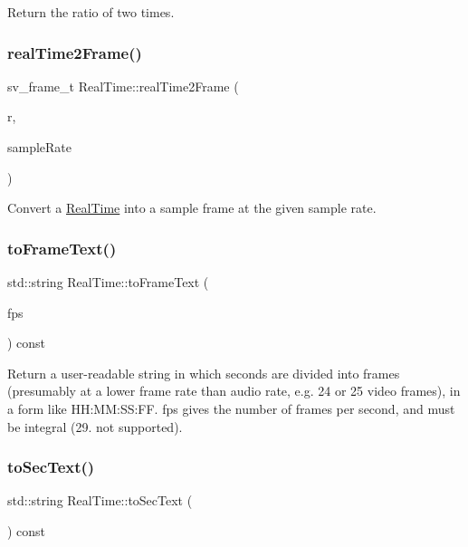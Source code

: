 Return the ratio of two times. \mbox{\label{struct_real_time_a3a99b7b0da96694a868e8fc211c41375}} 
\subsubsection{\texorpdfstring{real\+Time2\+Frame()}{realTime2Frame()}}
{\footnotesize\ttfamily sv\+\_\+frame\+\_\+t Real\+Time\+::real\+Time2\+Frame (\begin{DoxyParamCaption}\item[{const \hyperlink{struct_real_time}{Real\+Time} \&}]{r,  }\item[{sv\+\_\+samplerate\+\_\+t}]{sample\+Rate }\end{DoxyParamCaption})\hspace{0.3cm}{\ttfamily [static]}}

Convert a \hyperlink{struct_real_time}{Real\+Time} into a sample frame at the given sample rate. \mbox{\label{struct_real_time_a0e6101f57c3255646ad653726ee54b10}} 
\subsubsection{\texorpdfstring{to\+Frame\+Text()}{toFrameText()}}
{\footnotesize\ttfamily std\+::string Real\+Time\+::to\+Frame\+Text (\begin{DoxyParamCaption}\item[{int}]{fps }\end{DoxyParamCaption}) const}

Return a user-\/readable string in which seconds are divided into frames (presumably at a lower frame rate than audio rate, e.\+g. 24 or 25 video frames), in a form like H\+H\+:\+M\+M\+:\+SS\+:FF. fps gives the number of frames per second, and must be integral (29. not supported). \mbox{\label{struct_real_time_a439bc705afe0dc850a05a251c8b72401}} 
\subsubsection{\texorpdfstring{to\+Sec\+Text()}{toSecText()}}
{\footnotesize\ttfamily std\+::string Real\+Time\+::to\+Sec\+Text (\begin{DoxyParamCaption}{ }\end{DoxyParamCaption}) const}


